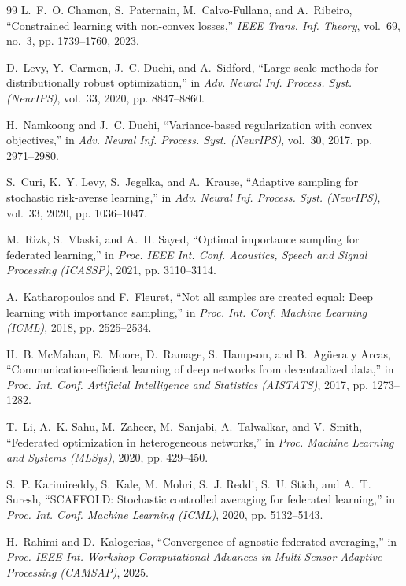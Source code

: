 \documentclass{article}
\theoremstyle{definition}
\begin{document}
\begin{thebibliography}{99}
L.~F.~O. Chamon, S.~Paternain, M.~Calvo-Fullana, and A.~Ribeiro, ``Constrained
learning with non-convex losses,'' \emph{IEEE Trans. Inf. Theory}, vol.~69,
no.~3, pp. 1739--1760, 2023.

D.~Levy, Y.~Carmon, J.~C. Duchi, and A.~Sidford, ``Large-scale methods for
distributionally robust optimization,'' in \emph{Adv. Neural Inf. Process.
Syst. (NeurIPS)}, vol.~33, 2020, pp. 8847--8860.

H.~Namkoong and J.~C. Duchi, ``Variance-based regularization with convex
objectives,'' in \emph{Adv. Neural Inf. Process. Syst. (NeurIPS)}, vol.~30,
2017, pp. 2971--2980.

S.~Curi, K.~Y. Levy, S.~Jegelka, and A.~Krause, ``Adaptive sampling for
stochastic risk-averse learning,'' in \emph{Adv. Neural Inf. Process. Syst.
(NeurIPS)}, vol.~33, 2020, pp. 1036--1047.

M.~Rizk, S.~Vlaski, and A.~H. Sayed, ``Optimal importance sampling for
federated learning,'' in \emph{Proc. IEEE Int. Conf. Acoustics, Speech and
Signal Processing (ICASSP)}, 2021, pp. 3110--3114.

A.~Katharopoulos and F.~Fleuret, ``Not all samples are created equal: Deep
learning with importance sampling,'' in \emph{Proc. Int. Conf. Machine
Learning (ICML)}, 2018, pp. 2525--2534.

H.~B. McMahan, E.~Moore, D.~Ramage, S.~Hampson, and B.~Ag\"{u}era y Arcas,
``Communication-efficient learning of deep networks from decentralized data,''
in \emph{Proc. Int. Conf. Artificial Intelligence and Statistics (AISTATS)},
2017, pp. 1273--1282.

T.~Li, A.~K. Sahu, M.~Zaheer, M.~Sanjabi, A.~Talwalkar, and V.~Smith,
``Federated optimization in heterogeneous networks,'' in \emph{Proc. Machine
Learning and Systems (MLSys)}, 2020, pp. 429--450.

S.~P. Karimireddy, S.~Kale, M.~Mohri, S.~J. Reddi, S.~U. Stich, and A.~T.
Suresh, ``SCAFFOLD: Stochastic controlled averaging for federated learning,''
in \emph{Proc. Int. Conf. Machine Learning (ICML)}, 2020, pp. 5132--5143.

H.~Rahimi and D.~Kalogerias, ``Convergence of agnostic federated averaging,''
in \emph{Proc. IEEE Int. Workshop Computational Advances in Multi-Sensor
Adaptive Processing (CAMSAP)}, 2025.


\end{thebibliography}
\end{document}
